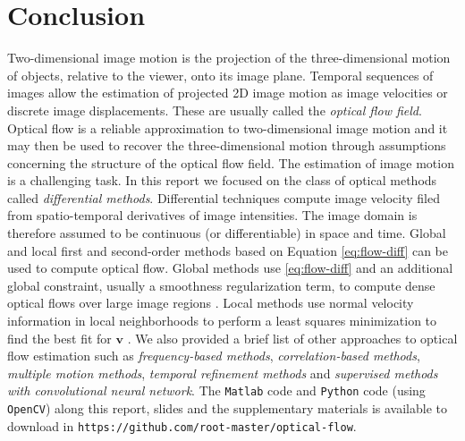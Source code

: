 \documentclass[letterpaper,11pt]{article}
\begin{document}
\section{Conclusion}
Two-dimensional image motion is the projection of the three-dimensional motion of
objects, relative to the viewer, onto its image plane. Temporal sequences of 
images allow the estimation of projected 2D image motion as image velocities or discrete image displacements. These are usually
called the \emph{optical flow field}. Optical flow is a reliable approximation to two-dimensional image motion and it may then be used to
recover the three-dimensional motion through assumptions
concerning the structure of the optical flow field. The estimation of image motion is a challenging task. In this report we focused on the class of optical methods called \emph{differential methods}. Differential techniques compute image velocity filed from spatio-temporal derivatives of image intensities. The image domain is therefore assumed to be continuous (or differentiable) in space and time. Global and local first and second-order methods based on Equation \eqref{eq:flow-diff} can be used to compute optical flow. Global methods use
\eqref{eq:flow-diff} and an additional global constraint, usually a smoothness regularization term, to compute dense optical flows over
large image regions \citep{Horn:Schunck:1981,Beauchemin:1995}. Local methods use normal velocity information in local neighborhoods to perform a least squares minimization to find the best fit for $\mathbf{v}$ \citep{Beauchemin:1995,Lucas:Kanade:1981}. We also provided a brief list of other approaches to optical flow estimation such as \emph{frequency-based methods}, \emph{correlation-based methods}, \emph{multiple motion methods}, \emph{temporal refinement methods} and \emph{supervised methods with convolutional neural network}. The \texttt{Matlab} code and \texttt{Python} code (using \texttt{OpenCV}) along this report, slides and the supplementary materials is available to download in \texttt{https://github.com/root-master/optical-flow}.  



\end{document}
